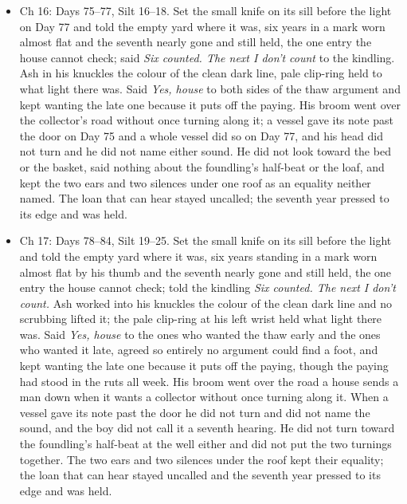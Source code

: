 \documentclass{design/chronicle}
\begin{document}
{\begin{itemize}[leftmargin=1.4em,itemsep=1pt,topsep=3pt,parsep=0pt]
\item Ch 16: Days 75–77, Silt 16–18. Set the small knife on its sill before the light on Day 77 and told the empty yard where it was, six years in a mark worn almost flat and the seventh nearly gone and still held, the one entry the house cannot check; said \emph{Six counted. The next I don’t count} to the kindling. Ash in his knuckles the colour of the clean dark line, pale clip-ring held to what light there was. Said \emph{Yes, house} to both sides of the thaw argument and kept wanting the late one because it puts off the paying. His broom went over the collector’s road without once turning along it; a vessel gave its note past the door on Day 75 and a whole vessel did so on Day 77, and his head did not turn and he did not name either sound. He did not look toward the bed or the basket, said nothing about the foundling’s half-beat or the loaf, and kept the two ears and two silences under one roof as an equality neither named. The loan that can hear stayed uncalled; the seventh year pressed to its edge and was held.

\end{itemize}

\begin{itemize}[leftmargin=1.4em,itemsep=1pt,topsep=3pt,parsep=0pt]

\item Ch 17: Days 78–84, Silt 19–25. Set the small knife on its sill before the light and told the empty yard where it was, six years standing in a mark worn almost flat by his thumb and the seventh nearly gone and still held, the one entry the house cannot check; told the kindling \emph{Six counted. The next I don’t count.} Ash worked into his knuckles the colour of the clean dark line and no scrubbing lifted it; the pale clip-ring at his left wrist held what light there was. Said \emph{Yes, house} to the ones who wanted the thaw early and the ones who wanted it late, agreed so entirely no argument could find a foot, and kept wanting the late one because it puts off the paying, though the paying had stood in the ruts all week. His broom went over the road a house sends a man down when it wants a collector without once turning along it. When a vessel gave its note past the door he did not turn and did not name the sound, and the boy did not call it a seventh hearing. He did not turn toward the foundling’s half-beat at the well either and did not put the two turnings together. The two ears and two silences under the roof kept their equality; the loan that can hear stayed uncalled and the seventh year pressed to its edge and was held.


\end{itemize}}
\end{document}

